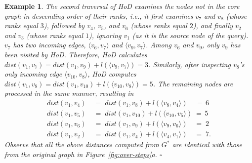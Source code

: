 \documentclass{sig-alternate}
\newtheorem{example} {Example}
\def\done{\hspace*{\fill} {$\square$}}
\def\vgap{\vspace{0mm}}
\def\G{G^*}
\def\d{dist}
\begin{document}
\begin{sloppy}
\begin{example}
\vgap

The second traversal of HoD examines the nodes {\em not} in the core graph in descending order of their ranks, i.e., it first examines $v_7$ and $v_8$ (whose ranks equal $3$), followed by $v_4$, $v_5$, and $v_6$ (whose ranks equal $2$), and finally $v_2$ and $v_3$ (whose ranks equal $1$), ignoring $v_1$ (as it is the source node of the query). $v_7$ has two incoming edges, $\langle v_6, v_7\rangle$ and $\langle v_9, v_7\rangle$. Among $v_6$ and $v_9$, only $v_9$ has been visited by HoD. Therefore, HoD calculates $\d(v_1, v_7) = \d(v_1, v_9) + l(\langle v_9, v_7\rangle) = 3$. Similarly, after inspecting $v_8$'s only incoming edge $\langle v_{10}, v_8\rangle$, HoD computes $\d(v_1, v_8) = \d(v_1, v_{10}) + l(\langle v_{10}, v_8\rangle) = 5$. The remaining nodes are processed in the same manner, resulting in
\vspace{-0mm}
\begin{align}
dist(v_1, v_4) \; &= \; dist(v_1, v_8) + l(\langle v_8, v_4\rangle)  \;\;\;\; = \, 6 \nonumber \\
dist(v_1, v_5) \; &= \; dist(v_1, v_{10}) + l(\langle v_{10}, v_5\rangle) \; = \, 5 \nonumber \\
dist(v_1, v_6) \; &= \; dist(v_1, v_{9}) + l(\langle v_{9}, v_6\rangle) \;\;\;\, = \; 2 \nonumber \\
dist(v_1, v_2) \; &= \; dist(v_1, v_{4}) + l(\langle v_{4}, v_1\rangle) \;\;\;\, = \; 7. \nonumber
\end{align}
\vspace{-0mm}
Observe that all the above distances computed from $\G$ are identical with those from the original graph in Figure~\ref{fig:over-steps}a. \done



\end{example}
\end{sloppy}
\end{document}
